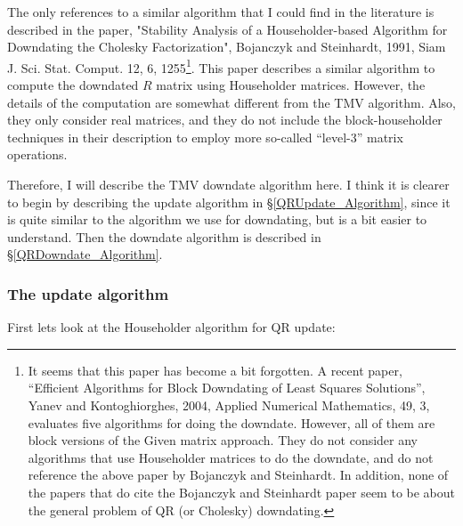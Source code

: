 The only references to a similar algorithm that I could find in the literature is 
described in the paper,
"Stability Analysis of a Householder-based Algorithm for Downdating the Cholesky Factorization", Bojanczyk and Steinhardt, 1991, Siam J. Sci. Stat. Comput. 12, 6, 
1255\footnote{
It seems that this paper has become a bit forgotten.  A recent paper,
``Efficient Algorithms for Block Downdating of Least Squares Solutions'', Yanev and Kontoghiorghes, 2004, Applied Numerical Mathematics, 49, 3, evaluates
five algorithms for doing the downdate.  However, all
of them are block versions of the Given matrix approach.  They do not consider 
any algorithms that use Householder matrices to do the downdate, and do not reference
the above paper by Bojanczyk and Steinhardt.  In addition, none of the papers that
do cite the Bojanczyk and Steinhardt paper seem to be about the general problem 
of QR (or Cholesky) downdating.
}.
This paper describes a similar algorithm to compute the downdated $R$ matrix
using Householder matrices.  However, the details of the computation are somewhat
different from the TMV algorithm.  Also, they only consider real matrices, and they 
do not include the block-householder techniques in their description to employ more
so-called ``level-3'' matrix operations.

Therefore, I will describe the TMV downdate algorithm here.  I think it is clearer to 
begin by describing the update algorithm in \S\ref{QRUpdate_Algorithm}, since it 
is quite similar to the algorithm we use for downdating, but is a bit easier to 
understand.  Then the downdate algorithm
is described in \S\ref{QRDowndate_Algorithm}.

\subsubsection{The update algorithm}
\label{QRUpdate_Algorithm}

First lets look at the Householder algorithm for QR update:

